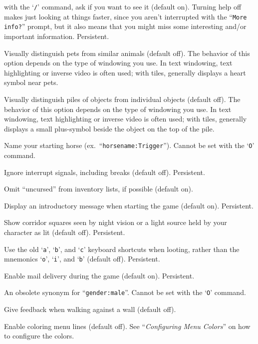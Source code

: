 with the `{\tt /}' command, ask if you want to see it (default on).
Turning help off makes just looking at things faster, since you aren't
interrupted with the ``{\tt More info?}'' prompt, but it also means that you
might miss some interesting and/or important information.  Persistent.
\item[\ib{hilite\verb+_+pet}]
Visually distinguish pets from similar animals (default off).
The behavior of this option depends on the type of windowing you use.
In text windowing, text highlighting or inverse video is often used;
with tiles, generally displays a heart symbol near pets.
\item[\ib{hilite\verb+_+pile}]
Visually distinguish piles of objects from individual objects (default off).
The behavior of this option depends on the type of windowing you use.
In text windowing, text highlighting or inverse video is often used;
with tiles, generally displays a small plus-symbol beside the object
on the top of the pile.
\item[\ib{horsename}]
Name your starting horse (ex.\ ``{\tt horsename:Trigger}'').
Cannot be set with the `{\tt O}' command.
\item[\ib{ignintr}]
Ignore interrupt signals, including breaks (default off).  Persistent.
\item[\ib{implicit\verb+_+uncursed}]
Omit ``uncursed'' from inventory lists, if possible (default on).
\item[\ib{legacy}]
Display an introductory message when starting the game (default on).
Persistent.
\item[\ib{lit\verb+_+corridor}]
Show corridor squares seen by night vision or a light source held by your
character as lit (default off).  Persistent.
\item[\ib{lootabc}]
Use the old `{\tt a}', `{\tt b}', and `{\tt c}' keyboard shortcuts when
looting, rather than the mnemonics `{\tt o}', `{\tt i}', and `{\tt b}' (default off).
Persistent.
\item[\ib{mail}]
Enable mail delivery during the game (default on).  Persistent.
\item[\ib{male}]
An obsolete synonym for ``{\tt gender:male}''.  Cannot be set with the
`{\tt O}' command.
\item[\ib{mention\verb+_+walls}]
Give feedback when walking against a wall (default off).
\item[\ib{menucolors}]
Enable coloring menu lines (default off).
See ``{\it Configuring Menu Colors\/}'' on how to configure the colors.
